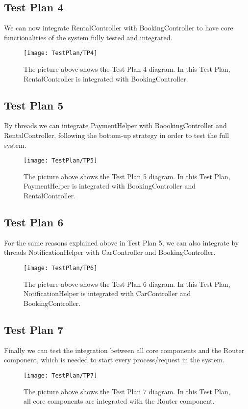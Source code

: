 \subsection{Test Plan 4}
We can now integrate RentalController with BookingController to have core functionalities of the system fully tested and integrated.
\begin{figure}[H]
	\centering
	\texttt{[image: TestPlan/TP4]}
	\caption[Test Plan 4 diagram]{The picture above shows the Test Plan 4 diagram. In this Test Plan, RentalController is integrated with BookingController.}
	\label{fig:TestPlan-4}
\end{figure}

\subsection{Test Plan 5}
By threads we can integrate PaymentHelper with BoookingController and RentalController, following the bottom-up strategy in order to test the full system.
\begin{figure}[H]
	\centering
	\texttt{[image: TestPlan/TP5]}
	\caption[Test Plan 5 diagram]{The picture above shows the Test Plan 5 diagram. In this Test Plan, PaymentHelper is integrated with BookingController and RentalController.}
	\label{fig:TestPlan-5}
\end{figure}

\subsection{Test Plan 6}
For the same reasons explained above in Test Plan 5, we can also integrate by threads NotificationHelper with CarController and BookingController.
\begin{figure}[H]
	\centering
	\texttt{[image: TestPlan/TP6]}
	\caption[Test Plan 6 diagram]{The picture above shows the Test Plan 6 diagram. In this Test Plan, NotificationHelper is integrated with CarController and BookingController.}
	\label{fig:TestPlan-6}
\end{figure}

\subsection{Test Plan 7}
Finally we can test the integration between all core components and the Router component, which is needed to start every process/request in the system.
\begin{figure}[H]
	\centering
	\texttt{[image: TestPlan/TP7]}
	\caption[Test Plan 7 diagram]{The picture above shows the Test Plan 7 diagram. In this Test Plan, all core components are integrated with the Router component.}
	\label{fig:TestPlan-7}
\end{figure}